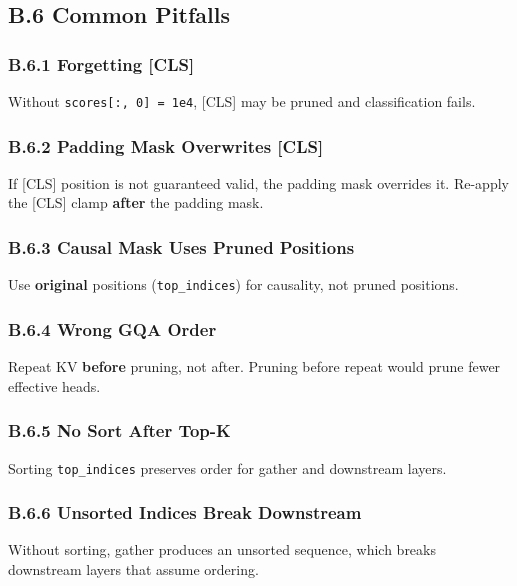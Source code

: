 \subsection{B.6 Common Pitfalls}

\subsubsection{B.6.1 Forgetting [CLS]}

Without \texttt{scores[:, 0] = 1e4}, [CLS] may be pruned and classification fails.

\subsubsection{B.6.2 Padding Mask Overwrites [CLS]}

If [CLS] position is not guaranteed valid, the padding mask overrides it. 
Re-apply the [CLS] clamp \textbf{after} the padding mask.

\subsubsection{B.6.3 Causal Mask Uses Pruned Positions}

Use \textbf{original} positions (\texttt{top\_indices}) for causality, not pruned 
positions.

\subsubsection{B.6.4 Wrong GQA Order}

Repeat KV \textbf{before} pruning, not after. Pruning before repeat would prune 
fewer effective heads.

\subsubsection{B.6.5 No Sort After Top-K}

Sorting \texttt{top\_indices} preserves order for gather and downstream layers.

\subsubsection{B.6.6 Unsorted Indices Break Downstream}

Without sorting, gather produces an unsorted sequence, which breaks 
downstream layers that assume ordering.




